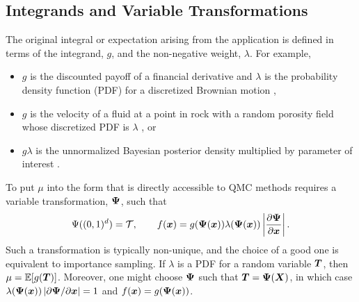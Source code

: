 \documentclass[graybox]{svmult}
\begin{document}
\subsection{Integrands and Variable Transformations} \label{CDHJS:sec:integrands}
The original integral or expectation arising from the application is defined in terms of the integrand, $g$, and the non-negative weight, $\lambda$.  For example,
\begin{itemize}
	\item $g$ is the discounted payoff of a financial derivative and $\lambda$ is the probability density function (PDF) for a discretized Brownian motion \cite{Gla03},

	\item  $g$ is the velocity of a fluid at a point in rock with a random porosity field whose discretized PDF is $\lambda$ \cite{KuoNuy16a}, or

	\item $g\lambda$ is the unnormalized Bayesian posterior density multiplied by parameter of interest \cite{GelEtal13}.
\end{itemize}

To put $\mu$ into the form that is directly accessible to QMC methods requires a variable transformation, ${\boldsymbol{\Psi}}$, such that
\begin{equation*}
    \Psi((0,1)^d) = {\mathcal{T}}, \qquad f({\boldsymbol{x}}) = g({\boldsymbol{\Psi}}({\boldsymbol{x}})) \lambda({\boldsymbol{\Psi}}({\boldsymbol{x}})) \left\vert\frac{\partial {\boldsymbol{\Psi}}}{\partial{\boldsymbol{x}}}\right\vert.
\end{equation*}
Such a transformation is typically non-unique, and the choice of a good one is equivalent to importance sampling.  If $\lambda$ is a PDF for a random variable ${\boldsymbol{T}}$, then $\mu = {\mathbb{E}}[g({\boldsymbol{T}})]$.  Moreover, one might choose ${\boldsymbol{\Psi}}$ such that ${\boldsymbol{T}} = {\boldsymbol{\Psi}}({\boldsymbol{X}})$, in which case $\lambda({\boldsymbol{\Psi}}({\boldsymbol{x}})) \left\vert\partial {\boldsymbol{\Psi}}/\partial{\boldsymbol{x}}\right\vert = 1$ and $f({\boldsymbol{x}}) = g({\boldsymbol{\Psi}}({\boldsymbol{x}}))$.
\end{document}
